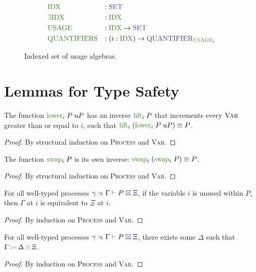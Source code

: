 \begin{figure}[h]
  \begin{equation}
    \begin{split}
      &\func{IDX}          &:{} &\Set \\
      &\func{\exists IDX}  &:{} &\func{IDX} \\
      &\func{USAGE}        &:{} &\func{IDX} \to \Set \\
      &\func{QUANTIFIERS}  &:{} &(i : \func{IDX}) \to \Quantifier_{\func{USAGE}_i}
    \end{split}
  \end{equation}
  \caption{Indexed set of usage algebras.}
  \label{fig:indexed-multiplicities}
\end{figure}

\section{Lemmas for Type Safety}
\label{app:lemmas-type-safety}

\begin{nilemma}
  \label{lm:lower-lift}
  The function $\func{lower}_i \; P \; uP$ has an inverse $\func{lift}_i \; P$ that increments every $\textsc{Var}$ greater than or equal to $i$, such that $\func{lift}_i \; (\func{lower}_i \; P \; uP) \equiv P$.
\end{nilemma}
\begin{proof}
  By structural induction on \textsc{Process} and \textsc{Var}.
\end{proof}

\begin{nilemma}
  \label{lm:swap-swap}
  The function $\func{swap}_i \; P$ is its own inverse: $\func{swap}_i \; (\func{swap}_i \; P) \equiv P$.
\end{nilemma}
\begin{proof}
  By structural induction on \textsc{Process} and \textsc{Var}.
\end{proof}

\begin{nilemma}
  \label{lm:types-unused}
  For all well-typed processes $\types{\gamma}{\Gamma}{P}{\Xi}$, if the variable $i$ is unused within $P$, then $\Gamma$ at $i$ is equivalent to $\Xi$ at $i$.
\end{nilemma}
\begin{proof}
  By induction on \textsc{Process} and \textsc{Var}.
\end{proof}

\begin{nilemma}
  \label{lm:types-op}
  For all well-typed processes $\types{\gamma}{\Gamma}{P}{\Xi}$, there exists some $\Delta$ such that $\opctx{\Gamma}{\Delta}{\Xi}$.
\end{nilemma}
\begin{proof}
  By induction on \textsc{Process} and \textsc{Var}.
\end{proof}

